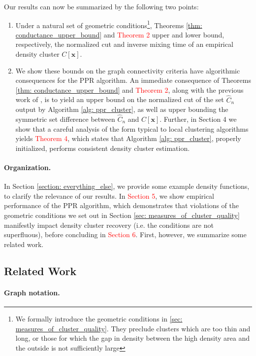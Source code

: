 \documentclass{article}
\newcommand{\x}{\mathbf{x}}
\newcommand{\1}{\mathbf{1}}
\theoremstyle{aldenthm}
\theoremstyle{remark}
\begin{document}
Our results can now be summarized by the following two points:

\begin{enumerate}
	\item 
	Under a natural set of geometric conditions\footnote{We formally introduce the geometric conditions in \ref{sec: measures_of_cluster_quality}. They preclude clusters which are too thin and long, or those for which the gap in density between the high density area and the outside is not sufficiently large}, Theorems \ref{thm: conductance_upper_bound} and \textcolor{red}{Theorem 2} upper and lower bound, respectively, the normalized cut and inverse mixing time of an empirical density cluster $C[\x]$.
	
	\item 
	We show these bounds on the graph connectivity criteria have algorithmic consequences for the PPR algorithm. An immediate consequence of Theorems \ref{thm: conductance_upper_bound} and \textcolor{red}{Theorem 2}, along with the previous work of \cite{zhu2013}, is to yield an upper bound on the normalized cut of the set $\widehat{C}_n$ output by Algorithm \ref{alg: ppr_cluster}, as well as upper bounding the symmetric set difference between $\widehat{C}_n$ and $C[\x]$. Further, in Section 4 we show that a careful analysis of the form typical to local clustering algorithms yields \textcolor{red}{Theorem 4}, which states that Algorithm \ref{alg: ppr_cluster}, properly initialized, performs consistent density cluster estimation.
\end{enumerate}

\paragraph{Organization.}
In Section \ref{section: everything_else}, we provide some example density functions, to clarify the relevance of our results. In \textcolor{red}{Section 5}, we show empirical performance of the PPR algorithm, which demonstrates that violations of the geometric conditions we set out in Section \ref{sec: measures_of_cluster_quality} manifestly impact density cluster recovery (i.e. the conditions are not superfluous), before concluding in \textcolor{red}{Section 6}. First, however, we summarize some related work.
\subsection{Related Work}


\paragraph{Graph notation.}
\end{document}
